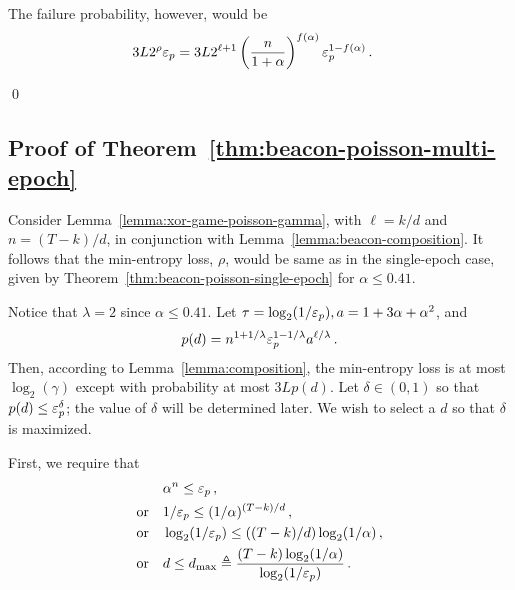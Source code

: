   The failure probability, however, would be 
  \begin{align*}
    3 L 2^\rho \mathsf{\varepsilon}_p
    &= 3 L 2^{\ell + 1} 
      \left(\frac{n}{1+\alpha}\right)^{f(\alpha)} 
      \mathsf{\varepsilon}_p^{1 - f(\alpha)}
      \,.
  \end{align*}
  
\hfill\qed


\subsection*{Proof of Theorem~\ref{thm:beacon-poisson-multi-epoch}}
  Consider Lemma~\ref{lemma:xor-game-poisson-gamma}, 
  with $\ell = k/d$ and $n = (T-k)/d$, 
  in conjunction with Lemma~\ref{lemma:beacon-composition}.
  It follows that the min-entropy loss, $\rho$, 
  would be same as in the single-epoch case, 
  given by Theorem~\ref{thm:beacon-poisson-single-epoch} 
  for $\alpha \leq 0.41$.









  Notice that $\lambda = 2$ since $\alpha \leq 0.41$.
  Let $\tau = \log_2(1/\mathsf{\varepsilon}_p), a = 1 + 3 \alpha + \alpha^2$,
  and 
  $$
    p(d) = n^{1+1/\lambda} \mathsf{\varepsilon}_p^{1 - 1/\lambda} a^{\ell/\lambda}
    \,.
  $$
  Then, according to Lemma~\ref{lemma:composition}, 
  the min-entropy loss is at most $\log_2(\gamma)$ 
  except with probability at most $3 L p(d)$. 
  Let $\delta \in (0, 1)$ so that $p(d) \leq \mathsf{\varepsilon}_p^\delta$; 
  the value of $\delta$ will be determined later. 
  We wish to select a $d$ so that $\delta$ is maximized.

  First, we require that 
  \begin{align*}
    &\alpha^n \leq \mathsf{\varepsilon}_p\,,\\
    \text{or}\quad &
      1/\mathsf{\varepsilon}_p \leq (1/\alpha)^{(T - k)/d}\,,\\
    \text{or}\quad &
      \log_2(1/\mathsf{\varepsilon}_p) \leq ((T - k)/d)\log_2(1/\alpha)\,,\\
    \text{or}\quad &
      d \leq d_\mathrm{max} \triangleq \frac{(T - k)\log_2(1/\alpha)}{\log_2(1/\mathsf{\varepsilon}_p)}
      \,.
  \end{align*}

